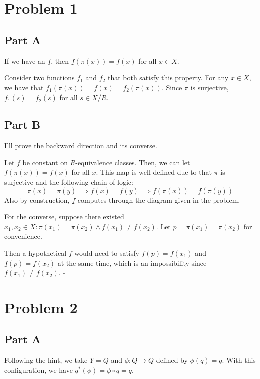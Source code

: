 \documentclass[12pt]{article}
\begin{document}
\section{Problem 1}\label{sec:p1}

\subsection{Part A}\label{sec:p1a}

If we have an $\underline{f}$, then $\underline{f}(\pi(x))=f(x)$ for all $x \in X$.

Consider two functions $f_1$ and $f_2$ that both satisfy this property.
For any $x \in X$, we have that $f_1(\pi(x))=f(x)=f_2(\pi(x))$.
Since $\pi$ is surjective, $f_1(s)=f_2(s)$ for all $s \in X/R$.

\subsection{Part B}\label{sec:p1b}

I'll prove the backward direction and its converse.

Let $f$ be constant on $R$-equivalence classes.
Then, we can let $\underline{f}(\pi(x))=f(x)$ for all $x$.
This map is well-defined due to that $\pi$ is surjective and the following chain of logic:
\[\pi(x)=\pi(y) \implies f(x)=f(y) \implies \underline{f}(\pi(x))=\underline{f}(\pi(y))\]
Also by construction, $\underline{f}$ computes through the diagram given in the problem.

For the converse, suppose there existed $x_1, x_2 \in X: \pi(x_1)=\pi(x_2) \land f(x_1) \ne f(x_2)$.
Let $p=\pi(x_1)=\pi(x_2)$ for convenience.

Then a hypothetical $\underline{f}$ would need to satisfy
$\underline{f}(p)=f(x_1)$ and $\underline{f}(p)=f(x_2)$ at the same time,
which is an impossibility since $f(x_1) \ne f(x_2)$. $\square$

\pagebreak

\section{Problem 2}\label{sec:p2}

\subsection{Part A}

Following the hint, we take $Y=Q$ and $\phi: Q \to Q$ defined by $\phi(q)=q$.
With this configuration, we have $q^*(\phi)=\phi \circ q=q$.
\end{document}
